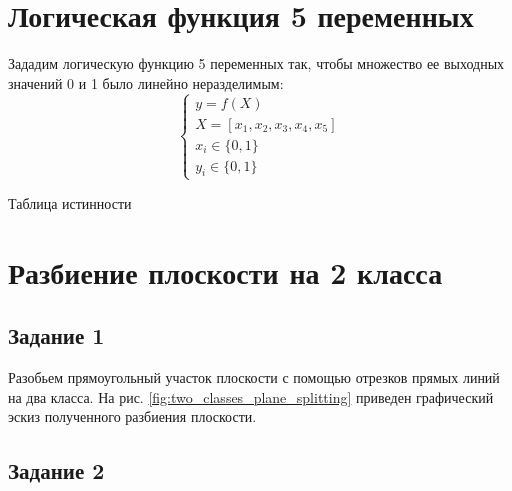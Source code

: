 \section{Логическая функция 5 переменных}

Зададим логическую функцию 5 переменных так, чтобы множество ее выходных значений 0 и 1 было линейно неразделимым:
\begin{equation*}
\begin{cases}
	y = f(X)\\
	X = [x_1, x_2, x_3, x_4, x_5]\\
	x_i \in \{0, 1\}\\
	y_i \in \{0, 1\}
\end{cases}
\end{equation*}

\vspace{-0.5cm}
\begin{table}[H]
\begin{center}
	\caption{Таблица истинности}
	\def\tabcolsep{15pt}
	\def\arraystretch{0.9}
\end{center}
\end{table}

\section{Разбиение плоскости на 2 класса}

\subsection{Задание 1}

Разобьем прямоугольный участок плоскости с помощью отрезков прямых линий на два класса. На рис. \ref{fig:two_classes_plane_splitting} приведен графический эскиз полученного разбиения плоскости.

\subsection{Задание 2}

